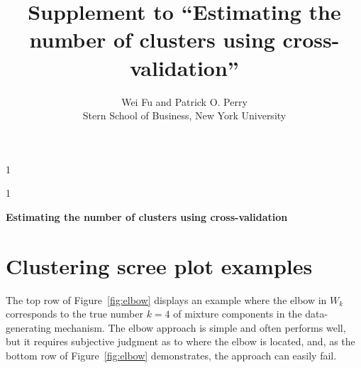 \documentclass[12pt]{article}
\newcommand{\blind}{1}
\begin{document}
%

\def\spacingset#1{\renewcommand{\baselinestretch}%
{#1}\small\normalsize} \spacingset{1}



\blind
{
  \title{\bf Supplement to ``Estimating the number of clusters using
cross-validation''}
  \author{Wei Fu and Patrick O. Perry \\
  Stern School of Business, New York University}
  \maketitle
} \fi

\blind
{
  \bigskip
  \bigskip
  \bigskip
  \begin{center}
    {\LARGE\bf Estimating the number of clusters using cross-validation}
\end{center}
  \medskip
} \fi

\bigskip

\spacingset{1.45} %

\section{Clustering scree plot examples}

\label{sec:elbow-fail}

The top row of Figure~\ref{fig:elbow}
displays an example where the elbow in $W_k$ corresponds to the true number $k
= 4$ of mixture components in the data-generating mechanism. The elbow
approach is simple and often performs well, but it requires subjective
judgment as to where the elbow is located, and, as the bottom row of
Figure~\ref{fig:elbow} demonstrates, the approach can easily fail.
\end{document}
